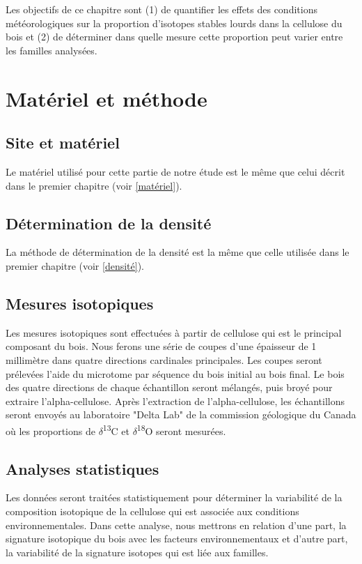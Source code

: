 \documentclass{report}
\newcommand{\Ctreize}{$\delta$\textsuperscript{13}C\xspace}
\newcommand{\Odixhuit}{$\delta$\textsuperscript{18}O\xspace}
\begin{document}
Les objectifs de ce chapitre sont (1) de quantifier les effets des conditions météorologiques sur la proportion d'isotopes stables lourds dans la cellulose du bois et (2) de déterminer dans quelle mesure cette proportion peut varier entre les familles analysées. %

\section{Matériel et méthode}

\subsection*{Site et matériel}
Le matériel utilisé pour cette partie de notre étude est le même que celui décrit dans le premier chapitre (voir \ref{matériel}).  

\subsection*{Détermination de la densité}
La méthode de détermination de la densité est la même que celle utilisée dans le premier chapitre (voir \ref{densité}). %

\subsection*{Mesures isotopiques}
Les mesures isotopiques sont effectuées à partir de cellulose qui est le principal composant du bois. Nous ferons une série de coupes d'une épaisseur de 1 millimètre dans quatre directions cardinales principales. Les coupes seront prélevées l'aide du microtome par séquence du bois initial au bois final. Le bois des quatre directions de chaque échantillon seront mélangés, puis broyé pour extraire l'alpha-cellulose. Après l'extraction de l'alpha-cellulose, les échantillons seront envoyés au laboratoire "Delta Lab" de la commission géologique du Canada où les proportions de \Ctreize et \Odixhuit seront mesurées.

\subsection*{Analyses statistiques}
Les données seront traitées statistiquement pour déterminer la variabilité de la composition isotopique de la cellulose qui est associée aux conditions environnementales. Dans cette analyse, nous mettrons en relation d'une part, la signature isotopique du bois avec les facteurs environnementaux et d'autre part, la variabilité de la signature isotopes qui est liée aux familles. \\
\end{document}
